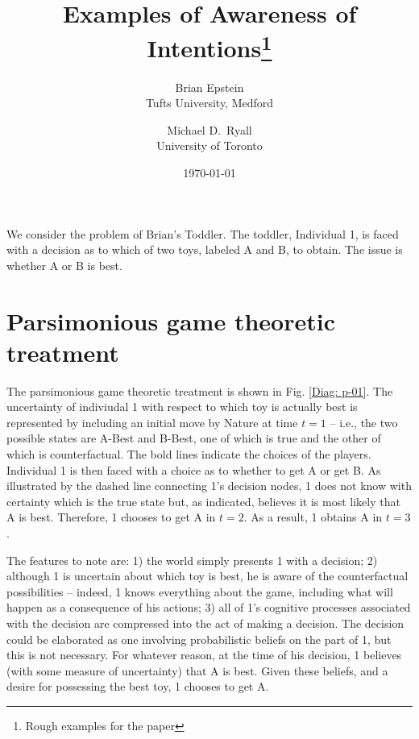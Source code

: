 \documentclass[
11pt,
titlepage,
reqno,
]{article}%
\theoremstyle{definition}
\begin{document}
	
\title
{
	Examples of Awareness of Intentions\thanks{Rough examples for the paper}
}
\author
{
	Brian Epstein \\Tufts University, Medford
	\and 
	Michael D.\ Ryall \\University of Toronto 
}
\date{\today}
\maketitle
	
	
	
\def\baselinestretch{1.5}\small\normalsize
\newcommand{\ra}[1]{\renewcommand{\arraystretch}{#1}}%
\newpage

We consider the problem of Brian's Toddler. The toddler, Individual 1, is faced with a decision as to which of two toys, labeled A and B, to obtain. The issue is whether A or B is best. 

\section*{Parsimonious game theoretic treatment}
The parsimonious game theoretic treatment is shown in Fig. \ref{Diag: p-01}. The uncertainty of indiviudal 1 with respect to which toy is actually best is represented by including an initial move by Nature at time $t=1$ -- i.e., the two possible states are A-Best and B-Best, one of which is true and the other of which is counterfactual. The bold lines indicate the choices of the players. Individual 1 is then faced with a choice as to whether to get A or get B. As illustrated by the dashed line connecting 1's decision nodes, 1 does not know with certainty which is the true state but, as indicated, believes it is most likely that A is best. Therefore, 1 chooses to get A in $t=2$. As a result, 1 obtains A in $t=3$.

The features to note are: 1) the world simply presents 1 with a decision; 2) although 1 is uncertain about which toy is best, he is aware of the counterfactual possibilities -- indeed, 1 knows everything about the game, including what will happen as a consequence of his actions; 3) all of 1's cognitive processes associated with the decision are compressed into the act of making a decision. The decision could be elaborated as one involving probabilistic beliefs on the part of 1, but this is not necessary. For whatever reason, at the time of his decision, 1 believes (with some measure of uncertainty) that A is best. Given these beliefs, and a desire for possessing the best toy, 1 chooses to get A.
\end{document}
